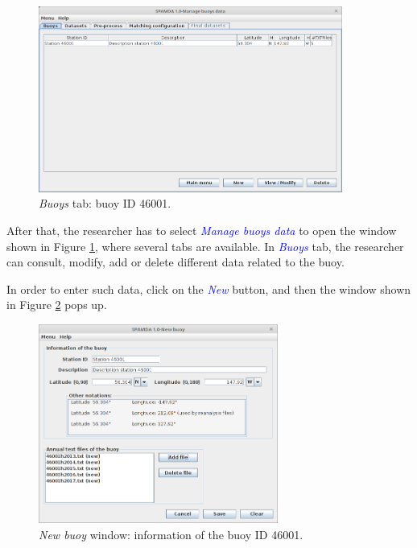 \documentclass[review]{elsarticle}
\begin{document}
			\begin{figure}[ht!]
				\centering
				\includegraphics[width=0.89\textwidth]{figures/FigureManage_buoys.png}
				\caption{\textit{Buoys} tab: buoy ID 46001.}\label{fig:manage_buoys}
			\end{figure}
			
			After that, the researcher has to select \textcolor{blue}{\textit{Manage buoys data}} to open the window shown in Figure \ref{fig:manage_buoys}, where several tabs are available. In \textcolor{blue}{\textit{Buoys}} tab, the researcher can consult, modify, add or delete different data related to the buoy.
			
			In order to enter such data, click on the \textcolor{blue}{\textit{New}} button, and then the window shown in Figure \ref{fig:new_buoy} pops up.

			\begin{figure}[ht!]
				\centering
				\includegraphics[width=0.70\textwidth]{figures/FigureNew_buoy.png}
				\caption{\textit{New buoy} window: information of the buoy ID 46001.}\label{fig:new_buoy}
			\end{figure}
			
\end{document}
